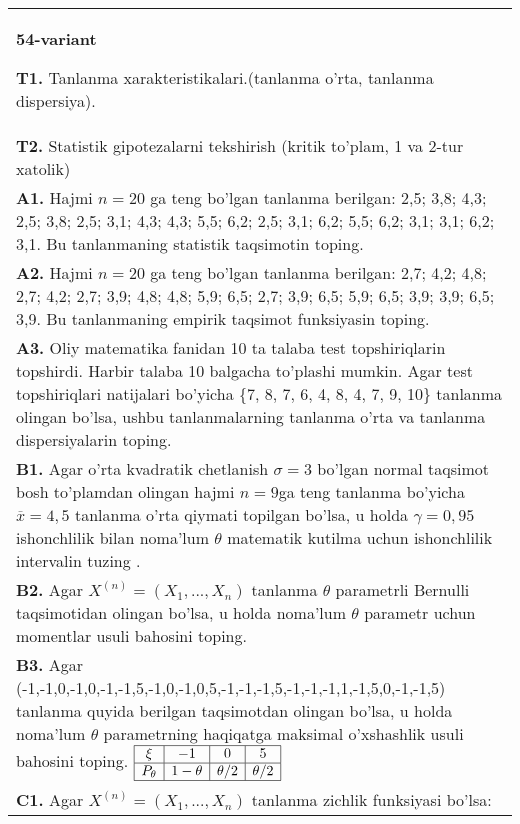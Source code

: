 \documentclass{article}
\begin{document}
\begin{tabular}{m{17cm}}
\textbf{54-variant}
\newline

\textbf{T1.} 
Tanlanma xarakteristikalari.(tanlanma o'rta, tanlanma dispersiya).
\\
\textbf{T2.} 
Statistik gipotezalarni tekshirish (kritik to'plam, 1 va 2-tur xatolik)
\\
\textbf{A1.} 
Hajmi \(n = 20\) ga teng bo'lgan tanlanma berilgan: 2,5; 3,8; 4,3; 2,5; 3,8; 2,5; 3,1; 4,3; 4,3; 5,5; 6,2; 2,5; 3,1; 6,2; 5,5; 6,2; 3,1; 3,1; 6,2; 3,1. Bu tanlanmaning statistik taqsimotin toping.
\\
\textbf{A2.} 
Hajmi \(n = 20\) ga teng bo'lgan tanlanma berilgan: 2,7; 4,2; 4,8; 2,7; 4,2; 2,7; 3,9; 4,8; 4,8; 5,9; 6,5; 2,7; 3,9; 6,5; 5,9; 6,5; 3,9; 3,9; 6,5; 3,9. Bu tanlanmaning empirik taqsimot funksiyasin toping.
\\
\textbf{A3.} 
Oliy matematika fanidan 10 ta talaba test topshiriqlarin topshirdi. Harbir talaba 10 balgacha to'plashi mumkin. Agar test topshiriqlari natijalari bo'yicha \{7, 8, 7, 6, 4, 8, 4, 7, 9, 10\} tanlanma olingan bo'lsa, ushbu tanlanmalarning tanlanma o'rta va tanlanma dispersiyalarin toping.
\\
\textbf{B1.} 
Agar o'rta kvadratik chetlanish \(\sigma = 3\) bo'lgan normal taqsimot bosh to'plamdan olingan hajmi \(n = 9\)ga teng tanlanma bo'yicha \(\overline{x} = 4,5\) tanlanma o'rta qiymati topilgan bo'lsa, u holda \(\gamma = 0,95\) ishonchlilik bilan noma'lum \(\theta\) matematik kutilma uchun ishonchlilik intervalin tuzing .
\\
\textbf{B2.} 
Agar \(X^{(n)} = \left( X_{1},...,X_{n} \right)\) tanlanma \(\theta\) parametrli Bernulli taqsimotidan olingan bo'lsa, u holda noma'lum \(\theta\) parametr uchun momentlar usuli bahosini toping.
\\
\textbf{B3.} 
Agar (-1,-1,0,-1,0,-1,-1,5,-1,0,-1,0,5,-1,-1,-1,5,-1,-1,-1,1,-1,5,0,-1,-1,5) tanlanma quyida berilgan taqsimotdan olingan bo'lsa, u holda noma'lum \(\theta\) parametrning haqiqatga maksimal o'xshashlik usuli bahosini toping.
$\begin{array}{|c|c|c|c|}
    \hline
    \xi & - 1 & 0 & 5\\
    \hline
    P_{\theta} & 1 - \theta & \theta/2 & \theta/2 \\
    \hline
\end{array}$
\\
\textbf{C1.} 
Agar \(X^{(n)} = \left( X_{1},...,X_{n} \right)\) tanlanma zichlik funksiyasi bo'lsa: \(f(x,\theta) = \left\{ \begin{matrix}

\end{matrix}
\end{tabular}
\end{document}
